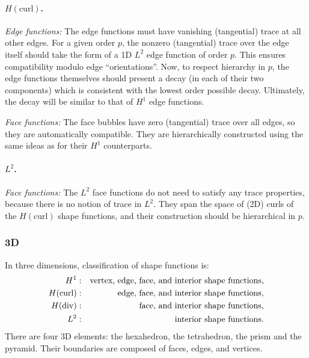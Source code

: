 \paragraph{$H(\mathrm{curl})$.}
\textit{Edge functions:}
The edge functions must have vanishing (tangential) trace at all other edges.
For a given order $p$, the nonzero (tangential) trace over the edge itself should take the form of a 1D $L^2$ edge function of order $p$.
This ensures compatibility modulo edge ``orientations''.
Now, to respect hierarchy in $p$, the edge functions themselves should present a decay (in each of their two components) which is consistent with the lowest order possible decay.
Ultimately, the decay will be similar to that of $H^1$ edge functions.

\textit{Face functions:}
The face bubbles have zero (tangential) trace over all edges, so they are automatically compatible.
They are hierarchically constructed using the same ideas as for their $H^1$ counterparts.

\paragraph{$L^2$.}
\textit{Face functions:}
The $L^2$ face functions do not need to satisfy any trace properties, because there is no notion of trace in $L^2$.
They span the space of (2D) curls of the $H(\mathrm{curl})$ shape functions, and their construction should be hierarchical in $p$.

\subsubsection{3D}

In three dimensions, classification of shape functions is:
\begin{align*}
  H^1:&\quad\text{vertex, edge, face, and interior shape functions,}\\
  H(\mathrm{curl}):&\quad \text{\phantom{vertex,} edge, face, and interior shape functions,}\\
  H(\mathrm{div}): &\quad\text{\phantom{vertex, edge,} face, and interior shape functions,}\\
  L^2:&\quad\text{\phantom{vertex, edge, face, and} interior shape functions.}
\end{align*}
There are four 3D elements: the hexahedron, the tetrahedron, the prism and the pyramid.
Their boundaries are composed of faces, edges, and vertices.



